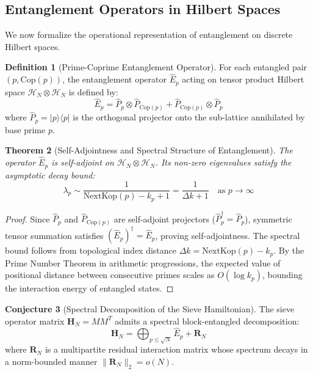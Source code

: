 \documentclass{article}
\numberwithin{equation}{section}
\theoremstyle{plain}
\newtheorem{theorem}{Theorem}[section]
\theoremstyle{definition}
\newtheorem{definition}[theorem]{Definition}
\newtheorem{conjecture}[theorem]{Conjecture}
\begin{document}
\subsection{Entanglement Operators in Hilbert Spaces}

We now formalize the operational representation of entanglement on discrete Hilbert spaces.

\begin{definition}[Prime-Coprime Entanglement Operator]
\label{def:operador-entrelazamiento}
For each entangled pair $(p, \mathrm{Cop}(p))$, the entanglement operator $\hat{E}_p$ acting on tensor product Hilbert space $\mathcal{H}_N \otimes \mathcal{H}_N$ is defined by:
\begin{equation}
\hat{E}_p = \hat{P}_p \otimes \hat{P}_{\mathrm{Cop}(p)} + \hat{P}_{\mathrm{Cop}(p)} \otimes \hat{P}_p
\end{equation}
where $\hat{P}_p = |p\rangle\langle p|$ is the orthogonal projector onto the sub-lattice annihilated by base prime $p$.
\end{definition}

\begin{theorem}[Self-Adjointness and Spectral Structure of Entanglement]
\label{thm:espectro-entrelazamiento}
The operator $\hat{E}_p$ is self-adjoint on $\mathcal{H}_N \otimes \mathcal{H}_N$. Its non-zero eigenvalues satisfy the asymptotic decay bound:
\begin{equation}
\lambda_p \sim \frac{1}{\mathrm{NextKop}(p) - k_p + 1} = \frac{1}{\Delta k + 1} \quad \text{as } p \to \infty
\end{equation}
\end{theorem}

\begin{proof}
Since $\hat{P}_p$ and $\hat{P}_{\mathrm{Cop}(p)}$ are self-adjoint projectors ($\hat{P}_p^\dagger = \hat{P}_p$), symmetric tensor summation satisfies $(\hat{E}_p)^\dagger = \hat{E}_p$, proving self-adjointness. The spectral bound follows from topological index distance $\Delta k = \mathrm{NextKop}(p) - k_p$. By the Prime Number Theorem in arithmetic progressions, the expected value of positional distance between consecutive primes scales as $O(\log k_p)$, bounding the interaction energy of entangled states.
\end{proof}

\begin{conjecture}[Spectral Decomposition of the Sieve Hamiltonian]
\label{conj:entrelazamiento-matriz}
The sieve operator matrix $\mathbf{H}_N = M M^T$ admits a spectral block-entangled decomposition:
\begin{equation}
\mathbf{H}_N = \bigoplus_{p \le \sqrt{N}} \hat{E}_p + \mathbf{R}_N
\end{equation}
where $\mathbf{R}_N$ is a multipartite residual interaction matrix whose spectrum decays in a norm-bounded manner $\| \mathbf{R}_N \|_2 = o(N)$.
\end{conjecture}
\end{document}
